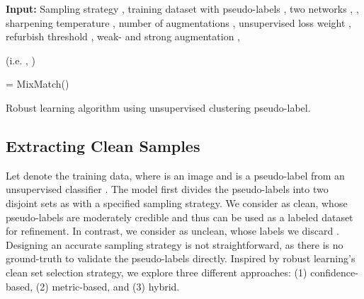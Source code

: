 \documentclass[final]{cvpr}
\begin{document}
\begin{algorithm*}[t!]
\DontPrintSemicolon
\SetAlgoLined
\SetNoFillComment 
\begin{flushleft}
 \textbf{Input:} Sampling strategy , training dataset with pseudo-labels , two networks ,  , sharpening temperature , number of augmentations , unsupervised loss weight , refurbish threshold , weak- and strong augmentation ,  \smallskip
 
\small{
   \space\space (i.e. ,   )

\For{}
{
\For{}
{
 \For{}
 {
 }
     
   
}

 = MixMatch()  
 }} \vspace{-3mm}
\end{flushleft}
\caption{Robust learning algorithm using unsupervised clustering pseudo-label.}
\label{algo:overall}
\end{algorithm*}


\subsection{Extracting Clean Samples}
\label{sec:cleaning}
Let  denote the training data, where  is an image and  is a pseudo-label from an unsupervised classifier .
The model first divides the pseudo-labels into two disjoint sets as  with a specified sampling strategy. We consider  as clean, whose pseudo-labels are moderately credible and thus can be used as a labeled dataset  for refinement. In contrast, we consider  as unclean, whose labels we discard .
Designing an accurate sampling strategy is not straightforward, as there is no ground-truth to validate the pseudo-labels directly. Inspired by robust learning's clean set selection strategy, we explore three different approaches: (1) confidence-based, (2) metric-based, and (3) hybrid. 
\end{document}
